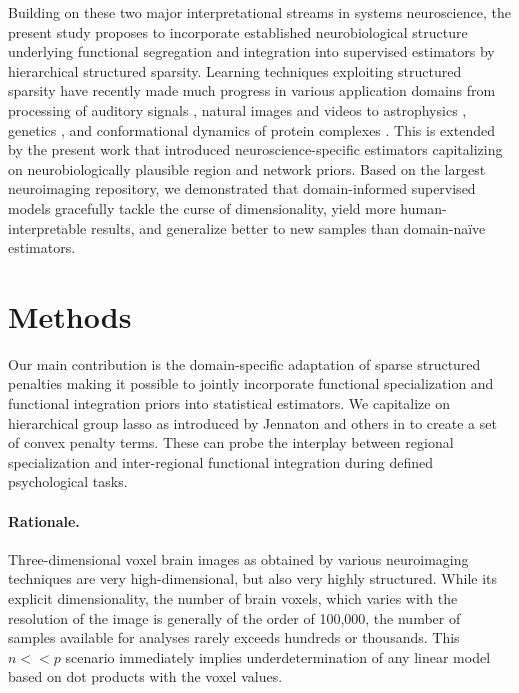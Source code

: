 \documentclass{article} %
\begin{document}
Building on these two major interpretational streams in systems neuroscience,
the present study proposes to incorporate
established neurobiological structure underlying
functional segregation and integration
into supervised estimators
by hierarchical structured sparsity.
%
Learning techniques
exploiting structured sparsity 
have recently made much progress in various application domains
from processing of auditory signals \cite{daudet2004sparse},
natural images \cite{harzallah2009combining} and
videos \cite{kang2015structured, kim2010sparse}
to
astrophysics \cite{vinci2014estimating},
genetics \cite{rapaport2008classification, kim2012tree},
and
conformational dynamics of protein complexes \cite{jenatton2009structured}.
%
This is extended by the present work that
introduced neuroscience-specific estimators capitalizing on
neurobiologically plausible region and network priors.
%
Based on the largest neuroimaging repository,
we demonstrated that domain-informed supervised models
gracefully tackle the curse of dimensionality,
yield more human-interpretable results,
and generalize better to new samples
than domain-na\"ive estimators.



\section{Methods}
Our main contribution is the domain-specific adaptation of sparse structured
penalties making it possible to jointly incorporate functional 
specialization and functional integration priors into statistical 
estimators.
We capitalize on hierarchical group lasso as introduced by Jennaton and 
others in \cite{jenatton2011structured} to create a set of convex penalty terms.
These can probe the interplay between regional specialization and 
inter-regional functional integration during defined psychological tasks.
%
\paragraph{Rationale.}
Three-dimensional voxel brain images as obtained by various neuroimaging
techniques are very high-dimensional, but also very highly structured.
While its explicit dimensionality, the number of brain voxels, which varies with
the resolution of the image is generally of the order of 100,000, the number
of samples available for analyses rarely exceeds hundreds or thousands.
This \(n << p\) scenario immediately implies underdetermination of any
linear model based on dot products with the voxel values.
\end{document}

